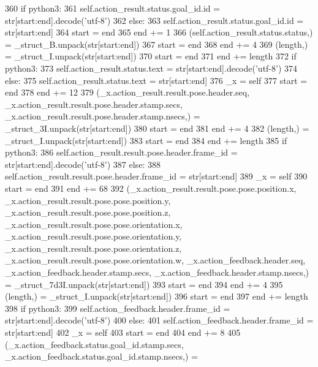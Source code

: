 \begin{DoxyCode}
360       \textcolor{keywordflow}{if} python3:
361         self.action\_result.status.goal\_id.id = str[start:end].decode(\textcolor{stringliteral}{'utf-8'})
362       \textcolor{keywordflow}{else}:
363         self.action\_result.status.goal\_id.id = str[start:end]
364       start = end
365       end += 1
366       (self.action\_result.status.status,) = \_struct\_B.unpack(str[start:end])
367       start = end
368       end += 4
369       (length,) = \_struct\_I.unpack(str[start:end])
370       start = end
371       end += length
372       \textcolor{keywordflow}{if} python3:
373         self.action\_result.status.text = str[start:end].decode(\textcolor{stringliteral}{'utf-8'})
374       \textcolor{keywordflow}{else}:
375         self.action\_result.status.text = str[start:end]
376       \_x = self
377       start = end
378       end += 12
379       (\_x.action\_result.result.pose.header.seq, \_x.action\_result.result.pose.header.stamp.secs, 
      \_x.action\_result.result.pose.header.stamp.nsecs,) = \_struct\_3I.unpack(str[start:end])
380       start = end
381       end += 4
382       (length,) = \_struct\_I.unpack(str[start:end])
383       start = end
384       end += length
385       \textcolor{keywordflow}{if} python3:
386         self.action\_result.result.pose.header.frame\_id = str[start:end].decode(\textcolor{stringliteral}{'utf-8'})
387       \textcolor{keywordflow}{else}:
388         self.action\_result.result.pose.header.frame\_id = str[start:end]
389       \_x = self
390       start = end
391       end += 68
392       (\_x.action\_result.result.pose.pose.position.x, \_x.action\_result.result.pose.pose.position.y, 
      \_x.action\_result.result.pose.pose.position.z, \_x.action\_result.result.pose.pose.orientation.x, 
      \_x.action\_result.result.pose.pose.orientation.y, \_x.action\_result.result.pose.pose.orientation.z, 
      \_x.action\_result.result.pose.pose.orientation.w, \_x.action\_feedback.header.seq, \_x.action\_feedback.header.stamp.secs, 
      \_x.action\_feedback.header.stamp.nsecs,) = \_struct\_7d3I.unpack(str[start:end])
393       start = end
394       end += 4
395       (length,) = \_struct\_I.unpack(str[start:end])
396       start = end
397       end += length
398       \textcolor{keywordflow}{if} python3:
399         self.action\_feedback.header.frame\_id = str[start:end].decode(\textcolor{stringliteral}{'utf-8'})
400       \textcolor{keywordflow}{else}:
401         self.action\_feedback.header.frame\_id = str[start:end]
402       \_x = self
403       start = end
404       end += 8
405       (\_x.action\_feedback.status.goal\_id.stamp.secs, \_x.action\_feedback.status.goal\_id.stamp.nsecs,) = 

\end{DoxyCode}
